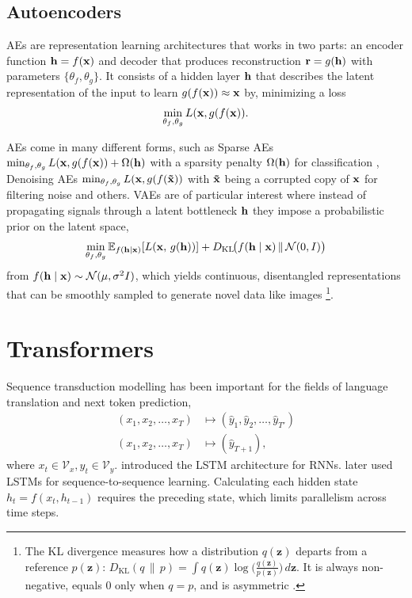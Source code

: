 \subsection{Autoencoders}

\acp{AE} are representation learning architectures that works in two parts: an encoder function $\bold h = f(\bold x)$ and decoder that produces reconstruction $\bold r = g(\bold h)$ with parameters $\{\theta_f, \theta_g\}$. It consists of a hidden layer $\bold h$ that describes the latent representation of the input to learn $g(f(\bold x)) \approx \bold x$ by, minimizing a loss 
\begin{equation*}
\min_{\theta_f, \theta_g} L(\bold x, g(f(\bold x)).
\end{equation*}

\acp{AE} come in many different forms, such as Sparse \acp{AE} $\min_{\theta_f, \theta_g} L(\bold x, g(f(\bold x)) + \Omega(\bold h)$ with a sparsity penalty $\Omega(\bold h)$ for classification \cite{SAE2024}, Denoising \acp{AE} $\min_{\theta_f, \theta_g} L(\bold x, g(f(\bold{\tilde{x}}))$ with $\bold{\tilde{x}}$ being a corrupted copy of $\bold x$ for filtering noise \cite{DAE2015} and others. \acp{VAE} are of particular interest where instead of propagating signals through a latent bottleneck $\bold h$ they impose a probabilistic prior on the latent space, 
\begin{equation*}
\min_{\theta_f,\theta_g}
\mathbb{E}_{f(\bold h\mid\bold x)}
[L(\bold x,\, g(\bold h))]
+ D_{\mathrm{KL}}\!\bigl(
  f(\bold h\mid\bold x)\,\|\,\mathcal{N}(0, I)
\bigr)
\end{equation*}
from $f(\bold h \mid\bold x) \sim \mathcal{N}(\mu, \sigma^2I)$, which yields continuous, disentangled representations that can be smoothly sampled to generate novel data like images \cite{VAE2020}\footnote{The \ac{KL} divergence measures how a distribution $q(\mathbf z)$ departs from a reference $p(\mathbf z)$: $D_{\mathrm{KL}}(q\,\|\,p)=\int q(\mathbf z)\log\bigl(\frac{q(\mathbf z)}{p(\mathbf z)}\bigr)\,d\mathbf z$. It is always non-negative, equals $0$ only when $q=p$, and is asymmetric \cite{KLDIV1951}.}.

\section{Transformers}

Sequence transduction modelling has been important for the fields of language translation and next token prediction,
\begin{align*}
    (x_1, x_2, \ldots, x_T) &\mapsto (\hat{y}_1, \hat{y}_2, \ldots, \hat{y}_{T'}) \\
    (x_1, x_2, \ldots, x_T) &\mapsto (\hat{y}_{T+1}),
\end{align*}
where $x_t \in \mathcal V_x, y_t \in \mathcal V_y$. \textcite{LSTM1997} introduced the \ac{LSTM} architecture for \acp{RNN}. \textcite{SEQ2SEQ2014} later used LSTMs for sequence-to-sequence learning. Calculating each hidden state $h_t = f(x_t, h_{t-1})$ requires the preceding state, which limits parallelism across time steps.

